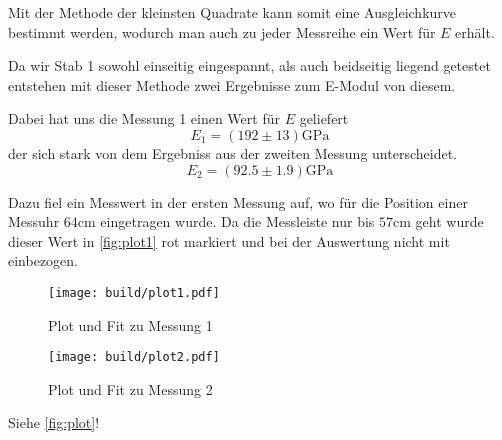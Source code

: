 Mit der Methode der kleinsten Quadrate kann somit eine Ausgleichkurve bestimmt
werden, wodurch man auch zu jeder Messreihe ein Wert für $E$ erhält.

\newpage
Da wir Stab 1 sowohl einseitig eingespannt, als auch beidseitig liegend 
getestet entstehen mit dieser Methode zwei Ergebnisse zum E-Modul von diesem.

Dabei hat uns die Messung 1 einen Wert für $E$ geliefert
\begin{equation}
	E_1 = (192 \pm 13) \si{\giga\pascal}
	\label{eqn:E_messung1}
\end{equation}
der sich stark von dem Ergebniss aus der zweiten Messung unterscheidet.
\begin{equation}
	E_2 = (92.5 \pm 1.9) \si{\giga\pascal}
	\label{eqn:E_messung2}
\end{equation}

Dazu fiel ein Messwert in der ersten Messung auf, wo für die Position
einer Messuhr
$64 \si{\cm}$ eingetragen wurde. Da die Messleiste nur bis $57 \si{\cm}$ geht
wurde dieser Wert in \autoref{fig:plot1} rot markiert und bei der Auswertung 
nicht mit einbezogen.

\begin{figure}[H]
	\texttt{[image: build/plot1.pdf]}
	\caption{Plot und Fit zu Messung 1}
	\label{fig:plot1}
\end{figure}
\begin{figure}[H]
	\texttt{[image: build/plot2.pdf]}
	\caption{Plot und Fit zu Messung 2}
	\label{fig:plot2}
\end{figure}

Siehe \autoref{fig:plot}!
